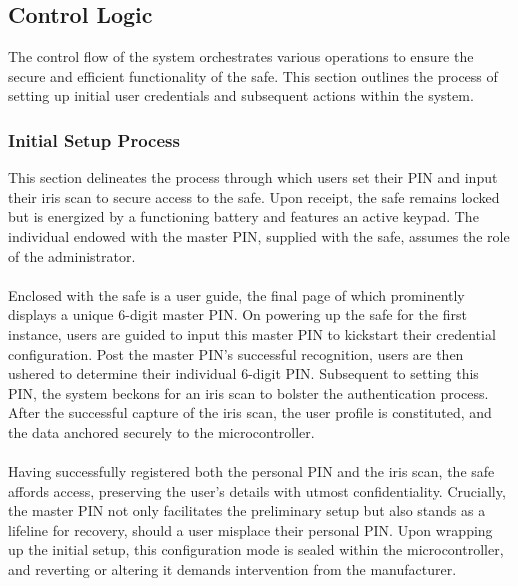 \documentclass{article}
\begin{document}
\subsection{Control Logic}
The control flow of the system orchestrates various operations to ensure the secure and efficient functionality of the safe. This section outlines the process of setting up initial user credentials and subsequent actions within the system.

\subsubsection{Initial Setup Process}
This section delineates the process through which users set their PIN and input their iris scan to secure access to the safe. Upon receipt, the safe remains locked but is energized by a functioning battery and features an active keypad. The individual endowed with the master PIN, supplied with the safe, assumes the role of the administrator. \\ \\
Enclosed with the safe is a user guide, the final page of which prominently displays a unique 6-digit master PIN. On powering up the safe for the first instance, users are guided to input this master PIN to kickstart their credential configuration. Post the master PIN's successful recognition, users are then ushered to determine their individual 6-digit PIN. Subsequent to setting this PIN, the system beckons for an iris scan to bolster the authentication process. After the successful capture of the iris scan, the user profile is constituted, and the data anchored securely to the microcontroller. \\ \\
Having successfully registered both the personal PIN and the iris scan, the safe affords access, preserving the user's details with utmost confidentiality. Crucially, the master PIN not only facilitates the preliminary setup but also stands as a lifeline for recovery, should a user misplace their personal PIN. Upon wrapping up the initial setup, this configuration mode is sealed within the microcontroller, and reverting or altering it demands intervention from the manufacturer.
\end{document}
